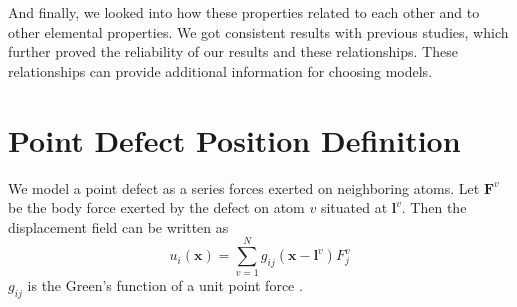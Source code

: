 \documentclass[%
 reprint,
 amsmath,amssymb,
 aps,
]{revtex4-1}
\begin{document}
And finally, we looked into how these properties related to each other and to other elemental properties.
We got consistent results with previous studies, which further proved the reliability of our results and these relationships.
These relationships can provide additional information for choosing models.

%
%
%
%

\appendix
\section{Point Defect Position Definition}
\label{app:position}
We model a point defect as a series forces exerted on neighboring atoms.
Let $\bm{F}^{v}$ be the body force exerted by the defect on atom $v$ situated at $\bm{l}^v$.
Then the displacement field can be written as
\begin{equation}
u_i(\bm{x}) = \sum_{v=1}^{N} g_{ij}(\bm{x}-\bm{l}^v) F_j^v
\end{equation}
$g_{ij}$ is the Green's function of a unit point force \cite{seifmultipolar,ting1997three}.
\end{document}
